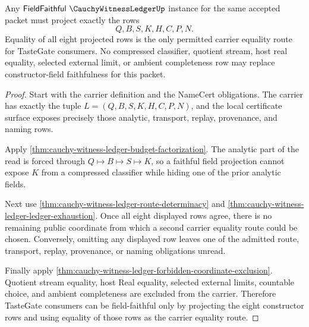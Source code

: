\begin{theorem}
\label{thm:cauchy-witness-ledger-field-faithful-row}
Any $\mathsf{FieldFaithful}\ \CauchyWitnessLedgerUp$ instance for the same accepted packet must project exactly the rows
$$
Q,B,S,K,H,C,P,N.
$$
Equality of all eight projected rows is the only permitted carrier equality route for TasteGate consumers. No compressed classifier, quotient stream, host real equality, selected external limit, or ambient completeness row may replace constructor-field faithfulness for this packet.
\end{theorem}
\begin{proof}
Start with the carrier definition and the NameCert obligations. The carrier has exactly the tuple $L=(Q,B,S,K,H,C,P,N)$, and the local certificate surface exposes precisely those analytic, transport, replay, provenance, and naming rows.

Apply \autoref{thm:cauchy-witness-ledger-budget-factorization}. The analytic part of the read is forced through $Q \longmapsto B \longmapsto S \longmapsto K$, so a faithful field projection cannot expose $K$ from a compressed classifier while hiding one of the prior analytic fields.

Next use \autoref{thm:cauchy-witness-ledger-route-determinacy} and \autoref{thm:cauchy-witness-ledger-ledger-exhaustion}. Once all eight displayed rows agree, there is no remaining public coordinate from which a second carrier equality route could be chosen. Conversely, omitting any displayed row leaves one of the admitted route, transport, replay, provenance, or naming obligations unread.

Finally apply \autoref{thm:cauchy-witness-ledger-forbidden-coordinate-exclusion}. Quotient stream equality, host Real equality, selected external limits, countable choice, and ambient completeness are excluded from the carrier. Therefore TasteGate consumers can be field-faithful only by projecting the eight constructor rows and using equality of those rows as the carrier equality route.
\end{proof}

